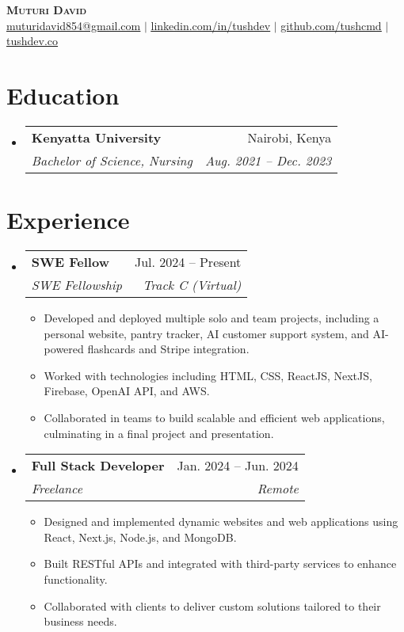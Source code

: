 \documentclass[letterpaper,11pt]{article}
\makeatletter
\newcommand{\resumeSubheading}[4]{
  \vspace{-2pt}\item
    \begin{tabular*}{\textwidth}{l@{\extracolsep{\fill}}r}
      \textbf{#1} & #2 \\
      \textit{\small#3} & \textit{\small #4} \\
    \end{tabular*}\vspace{-7pt}
}
\newcommand{\resumeSubItem}[1]{\item\small{#1 \vspace{-2pt}}}
\newcommand{\resumeSubHeadingListStart}{\begin{itemize}[leftmargin=0.15in, label={}]}
\newcommand{\resumeSubHeadingListEnd}{\end{itemize}}
\newcommand{\resumeItemListStart}{\begin{itemize}}
\newcommand{\resumeItemListEnd}{\end{itemize}\vspace{-5pt}}
\makeatother
\begin{document}
\begin{center}
    \textbf{\Huge \scshape Muturi David} \\ \vspace{1pt} 
    \href{mailto:muturidavid854@gmail.com}
    {\underline{ muturidavid854@gmail.com}} $|$
    \href{https://linkedin.com/in/tushdev}{\underline{linkedin.com/in/tushdev}} $|$
    \href{https://github.com/tushcmd}{\underline{github.com/tushcmd}} $|$
    \href{https://tushdev.co/}{\underline{tushdev.co}}
\end{center}

\section{Education}
  \resumeSubHeadingListStart
    \resumeSubheading
      {Kenyatta University}{Nairobi, Kenya}
      {Bachelor of Science, Nursing}{Aug. 2021 -- Dec. 2023}
  \resumeSubHeadingListEnd

\section{Experience}
  \resumeSubHeadingListStart

    \resumeSubheading
      {SWE Fellow}{Jul. 2024 -- Present}
      {SWE Fellowship}{Track C (Virtual)}
      \resumeItemListStart
        \resumeSubItem{Developed and deployed multiple solo and team projects, including a personal website, pantry tracker, AI customer support system, and AI-powered flashcards and Stripe integration.}
        \resumeSubItem{Worked with technologies including HTML, CSS, ReactJS, NextJS, Firebase, OpenAI API, and AWS.}
        \resumeSubItem{Collaborated in teams to build scalable and efficient web applications, culminating in a final project and presentation.}
      \resumeItemListEnd
      
    \resumeSubheading
      {Full Stack Developer}{Jan. 2024 -- Jun. 2024}
      {Freelance}{Remote}
      \resumeItemListStart
        \resumeSubItem{Designed and implemented dynamic websites and web applications using React, Next.js, Node.js, and MongoDB.}
        \resumeSubItem{Built RESTful APIs and integrated with third-party services to enhance functionality.}
        \resumeSubItem{Collaborated with clients to deliver custom solutions tailored to their business needs.}
      \resumeItemListEnd

  \resumeSubHeadingListEnd
\end{document}
